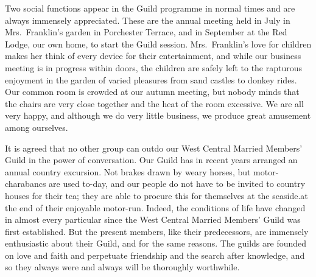 Two social functions appear in the Guild programme
in normal times and are always immensely appreciated.
These are the annual meeting held in July in Mrs.\ Franklin’s
garden in Porchester Terrace, and in September at
the Red Lodge, our own home, to start the Guild session.
Mrs.\ Franklin’s love for children makes her think of every
device for their entertainment, and while our business
meeting is in progress within doors, the children are safely
left to the rapturous enjoyment in the garden of varied
pleasures from sand castles to donkey rides. Our common
room is crowded at our autumn meeting, but nobody
minds that the chairs are very close together and the heat
of the room excessive. We are all very happy, and
although we do very little business, we produce great
amusement among ourselves.

It is agreed that no other group can outdo our West
Central Married Members’ Guild in the power of conversation.
Our Guild has in recent years arranged an
annual country excursion. Not brakes drawn by weary
horses, but motor-charabancs are used to-day, and our
people do not have to be invited to country houses for
their tea; they are able to procure this for themselves
at the seaside.at the end of their enjoyable motor-run.
Indeed, the conditions of life have changed in almost
every particular since the West Central Married
Members’ Guild was first established. But the present members,
like their predecessors, are immensely enthusiastic about
their Guild, and for the same reasons. The guilds are
founded on love and faith and perpetuate friendship and
the search after knowledge, and so they always were and
always will be thoroughly worthwhile.
